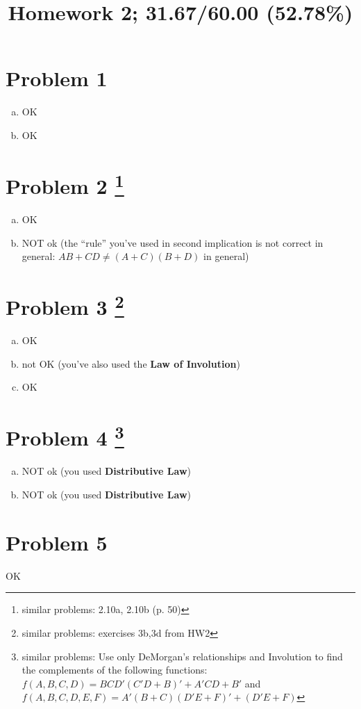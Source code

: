 \documentclass[10pt]{article} %
\title{Homework 2;
31.67/60.00 (52.78\%)
}
\begin{document}
\maketitle

\section*{Problem 1 }
\begin{enumerate}[(a)]
  \item OK
  \item OK
\end{enumerate}
\section*{Problem 2  \footnote{similar problems: 2.10a, 2.10b (p. 50)}}
\begin{enumerate}[(a)]
  \item OK
  \item NOT ok (the ``rule'' you've used in second implication is not correct in general: $AB+CD\neq (A+C)(B+D)$ in general)
\end{enumerate}
\section*{Problem 3  \footnote{similar problems: exercises 3b,3d from HW2}}
\begin{enumerate}[(a)]
  \item OK
  \item not OK (you've also used the \textbf{Law of Involution})
  \item OK
\end{enumerate}
\section*{Problem 4  \footnote{similar problems: Use only DeMorgan’s relationships and Involution to find the complements of the following functions: $f(A,B,C,D)=BCD'(C'D+B)'+A'CD+B'$ 
and $f(A,B,C,D,E,F)=A'(B+C)(D'E+F)'+\left( D'E+F \right)$}}
\begin{enumerate}[(a)]
  \item NOT ok (you used \textbf{Distributive Law})
  \item NOT ok (you used \textbf{Distributive Law})
\end{enumerate}
\section*{Problem 5 }
OK
\end{document}
